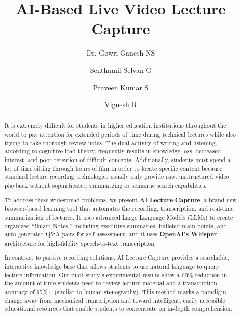 \documentclass[runningheads]{llncs}
\begin{document}
%
\title{AI-Based Live Video Lecture Capture}
%
%
\author{Dr. Gowri Ganesh NS \and Senthamil Selvan G \and Praveen Kumar S \and Vignesh R}
%
\authorrunning{ } %
\titlerunning{ } %
%
%
\maketitle              %
%
\begin{abstract}
It is extremely difficult for students in higher education institutions throughout the world to pay attention for extended periods of time during technical lectures while also trying to take thorough review notes. The dual activity of writing and listening, according to cognitive load theory, frequently results in knowledge loss, decreased interest, and poor retention of difficult concepts. Additionally, students must spend a lot of time sifting through hours of film in order to locate specific content because standard lecture recording technologies usually only provide raw, unstructured video playback without sophisticated summarizing or semantic search capabilities.

To address these widespread problems, we present \textbf{AI Lecture Capture}, a brand-new browser-based learning tool that automates the recording, transcription, and real-time summarization of lectures. It uses advanced Large Language Models (LLMs) to create organized ``Smart Notes,'' including executive summaries, bulleted main points, and auto-generated Q\&A pairs for self-assessment, and it uses \textbf{OpenAI's Whisper} architecture for high-fidelity speech-to-text transcription.

In contrast to passive recording solutions, AI Lecture Capture provides a searchable, interactive knowledge base that allows students to use natural language to query lecture information. Our pilot study's experimental results show a 60\% reduction in the amount of time students need to review lecture material and a transcription accuracy of 95\%+ (similar to human stenography). This method marks a paradigm change away from mechanical transcription and toward intelligent, easily accessible educational resources that enable students to concentrate on in-depth comprehension.

\end{abstract}
%
%
%
\end{document}
